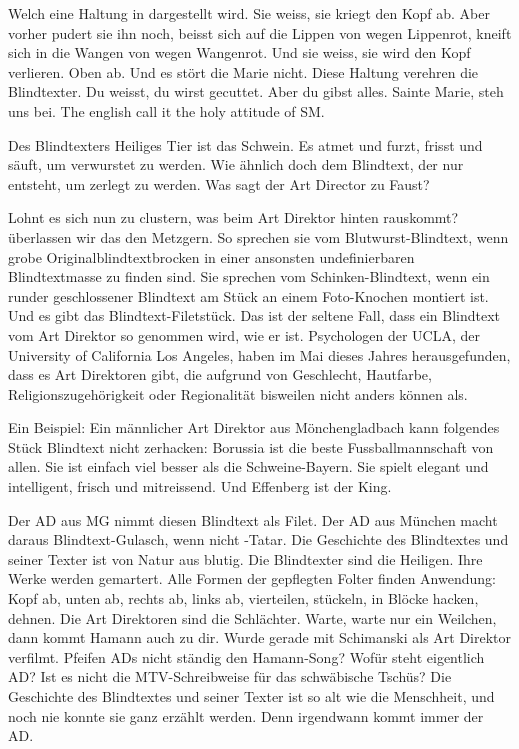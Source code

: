 Welch eine Haltung in dargestellt wird. Sie weiss, sie kriegt den Kopf ab. Aber vorher pudert sie ihn noch, beisst sich auf die Lippen von wegen Lippenrot, kneift sich in die Wangen von wegen Wangenrot. Und sie weiss, sie wird den Kopf verlieren. Oben ab. Und es stört die Marie nicht. Diese Haltung verehren die Blindtexter. Du weisst, du wirst gecuttet. Aber du gibst alles. Sainte Marie, steh uns bei. The english call it the holy attitude of SM.

Des Blindtexters Heiliges Tier ist das Schwein. Es atmet und furzt, frisst und säuft, um verwurstet zu werden. Wie ähnlich doch dem Blindtext, der nur entsteht, um zerlegt zu werden. Was sagt der Art Director zu Faust?

Lohnt es sich nun zu clustern, was beim Art Direktor hinten rauskommt? überlassen wir das den Metzgern. So sprechen sie vom Blutwurst-Blindtext, wenn grobe Originalblindtextbrocken in einer ansonsten undefinierbaren Blindtextmasse zu finden sind. Sie sprechen vom Schinken-Blindtext, wenn ein runder geschlossener Blindtext am Stück an einem Foto-Knochen montiert ist. Und es gibt das Blindtext-Filetstück. Das ist der seltene Fall, dass ein Blindtext vom Art Direktor so genommen wird, wie er ist. Psychologen der UCLA, der University of California Los Angeles, haben im Mai dieses Jahres herausgefunden, dass es Art Direktoren gibt, die aufgrund von Geschlecht, Hautfarbe, Religionszugehörigkeit oder Regionalität bisweilen nicht anders können als.

Ein Beispiel: Ein männlicher Art Direktor aus Mönchengladbach kann folgendes Stück Blindtext nicht zerhacken: Borussia ist die beste Fussballmannschaft von allen. Sie ist einfach viel besser als die Schweine-Bayern. Sie spielt elegant und intelligent, frisch und mitreissend. Und Effenberg ist der King.

Der AD aus MG nimmt diesen Blindtext als Filet. Der AD aus München macht daraus Blindtext-Gulasch, wenn nicht -Tatar. Die Geschichte des Blindtextes und seiner Texter ist von Natur aus blutig. Die Blindtexter sind die Heiligen. Ihre Werke werden gemartert. Alle Formen der gepflegten Folter finden Anwendung: Kopf ab, unten ab, rechts ab, links ab, vierteilen, stückeln, in Blöcke hacken, dehnen. Die Art Direktoren sind die Schlächter. Warte, warte nur ein Weilchen, dann kommt Hamann auch zu dir. Wurde gerade mit Schimanski als Art Direktor verfilmt. Pfeifen ADs nicht ständig den Hamann-Song? Wofür steht eigentlich AD? Ist es nicht die MTV-Schreibweise für das schwäbische Tschüs? Die Geschichte des Blindtextes und seiner Texter ist so alt wie die Menschheit, und noch nie konnte sie ganz erzählt werden. Denn irgendwann kommt immer der AD.

